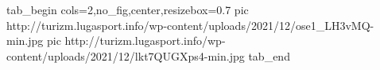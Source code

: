  
 
 
 
 


\ifcmt
  tab_begin cols=2,no_fig,center,resizebox=0.7
     pic http://turizm.lugasport.info/wp-content/uploads/2021/12/ose1_LH3vMQ-min.jpg
		 pic http://turizm.lugasport.info/wp-content/uploads/2021/12/lkt7QUGXps4-min.jpg
  tab_end
\fi
